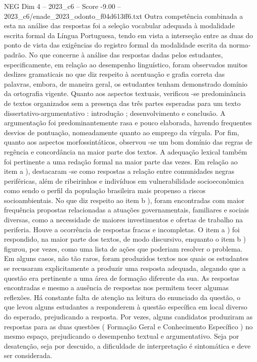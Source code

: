 \begin{textsample}{NEG Dim 4 – 2023\_c6 – Score -9.00 – 2023\_c6/enade\_2023\_odonto\_f04d613ff6.txt}
Outra competência combinada a esta na análise das respostas foi a seleção vocabular adequada à modalidade escrita formal da Língua Portuguesa, tendo em vista a interseção entre as duas do ponto de vista das exigências do registro formal da modalidade escrita da norma-padrão.
No que concerne à análise das respostas dadas pelos estudantes, especificamente, em relação ao desempenho linguístico, foram observados muitos deslizes gramaticais no que diz respeito à acentuação e grafia correta das palavras, embora, de maneira geral, os estudantes tenham demonstrado domínio da ortografia vigente.
Quanto aos aspectos textuais, verificou -se predominância de textos organizados sem a presença das três partes esperadas para um texto dissertativo-argumentativo : introdução ; desenvolvimento e conclusão.
A argumentação foi predominantemente rasa e pouco elaborada, havendo frequentes desvios de pontuação, nomeadamente quanto ao emprego da vírgula.
Por fim, quanto aos aspectos morfossintáticos, observou -se um bom domínio das regras de regência e concordância na maior parte dos textos.
A adequação lexical também foi pertinente a uma redação formal na maior parte das vezes.
Em relação ao item a ), destacaram -se como respostas a relação entre comunidades negras periféricas, além de ribeirinhos e indivíduos em vulnerabilidade socioeconômica como sendo o perfil da população brasileira mais propenso a riscos socioambientais.
No que diz respeito ao item b ), foram encontradas com maior frequência propostas relacionadas a atuações governamentais, familiares e sociais diversas, como a necessidade de maiores investimentos e ofertas de trabalho na periferia.
Houve a ocorrência de respostas fracas e incompletas.
O item a ) foi respondido, na maior parte dos textos, de modo discursivo, enquanto o item b ) figurou, por vezes, como uma lista de ações que poderiam resolver o problema.
Em alguns casos, não tão raros, foram produzidos textos nos quais os estudantes se recusaram explicitamente a produzir uma resposta adequada, alegando que a questão era pertinente a uma área de formação diferente da sua.
As respostas encontradas e mesmo a ausência de respostas nos permitem tecer algumas reflexões.
Há constante falta de atenção na leitura do enunciado da questão, o que levou alguns estudantes a responderem à questão específica em local diverso do esperado, prejudicando a resposta.
Por vezes, alguns candidatos produziram as respostas para as duas questões ( Formação Geral e Conhecimento Específico ) no mesmo espaço, prejudicando o desempenho textual e argumentativo.
Seja por desatenção, seja por descuido, a dificuldade de interpretação é sintomática e deve ser considerada.

\end{textsample}
